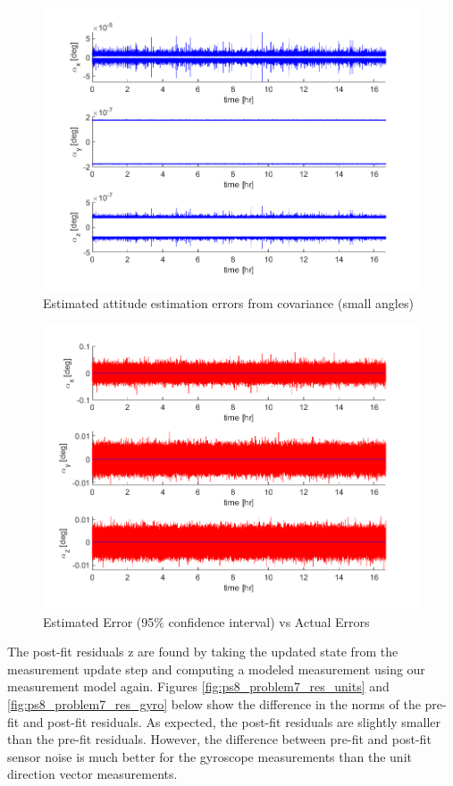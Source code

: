 \begin{figure}[H]
\centering
\includegraphics[scale=0.8]{Images/ps8_problem7_cov.png}
\caption{Estimated attitude estimation errors from covariance (small angles)}
\label{fig:ps8_problem7_cov}
\end{figure}

\begin{figure}[H]
\centering
\includegraphics[scale=0.8]{Images/ps8_problem7_covComp.png}
\caption{Estimated Error (95\% confidence interval) vs Actual Errors}
\label{fig:ps8_problem7_covComp}
\end{figure}

The post-fit residuals z are found by taking the updated state from the measurement update step and computing a modeled measurement using our measurement model again. Figures \ref{fig:ps8_problem7_res_units} and \ref{fig:ps8_problem7_res_gyro} below show the difference in the norms of the pre-fit and post-fit residuals. As expected, the post-fit residuals are slightly smaller than the pre-fit residuals. However, the difference between pre-fit and post-fit sensor noise is much better for the gyroscope measurements than the unit direction vector measurements.

